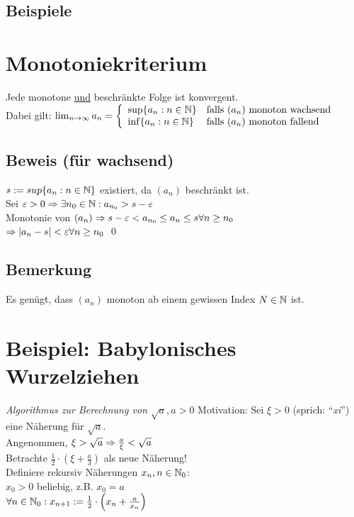 \subsection*{Beispiele}

\section{Monotoniekriterium}\label{5.10}
Jede monotone \underline{und} beschränkte Folge ist konvergent.\\
Dabei gilt: $\lim_{n \to \infty} a_n = \left\{\begin{array}{l l}
\sup\{a_n: n \in \mathbb{N}\} & \text{falls } (a_n) \text{ monoton wachsend}\\
\inf\{a_n: n \in \mathbb{N}\} & \text{falls } (a_n) \text{ monoton fallend}
\end{array} \right.$

\subsection*{Beweis (für wachsend)}
$s := sup\{a_n: n \in \mathbb{N}\}$ existiert, da $(a_n)$ beschränkt ist.\\
Sei $\varepsilon > 0 \Rightarrow \exists n_0 \in \mathbb{N}: a_{n_0} > s-\varepsilon$\\
Monotonie von $(a_n) \Rightarrow s-\varepsilon < a_{n_0} \le a_n \le s \forall n \ge n_0$\\
$\Rightarrow |a_n-s| < \varepsilon \forall n \ge n_0$ \qed

\subsection*{Bemerkung}
Es genügt, dass $(a_n)$ monoton ab einem gewissen Index $N \in \mathbb{N}$ ist.

\newpage

\section{Beispiel: Babylonisches Wurzelziehen}\label{5.11}
\emph{Algorithmus zur Berechnung von $\sqrt{a}, a > 0$}\nl
Motivation: Sei $\xi > 0$  (sprich: ``\emph{xi}'') eine Näherung für $\sqrt{a}$.\\
Angenommen, $\xi > \sqrt{a} \Rightarrow \frac{a}{\xi} < \sqrt{a}$\\
Betrachte $\frac{1}{2} \cdot \left(\xi + \frac{a}{3}\right)$ als neue Näherung!\\
Definiere rekursiv Näherungen $x_n, n \in \mathbb{N}_0$:\\
$x_0 > 0$ beliebig, z.B. $x_0 = a$\\
$\forall n \in \mathbb{N}_0: x_{n+1} := \frac{1}{2} \cdot \left(x_n + \frac{a}{x_n}\right)$

